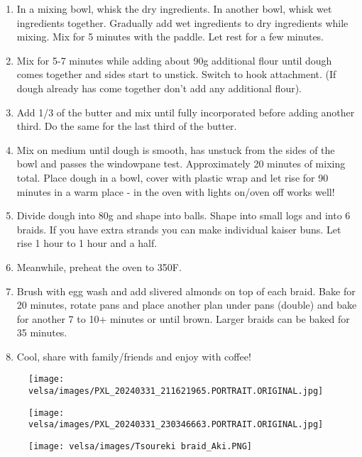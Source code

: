 \begin{enumerate}
    \item  In a mixing bowl, whisk the dry ingredients. In another bowl, whisk wet ingredients together. Gradually add wet ingredients to dry ingredients while mixing. Mix for 5 minutes with the paddle. Let rest for a few minutes.
    \item  Mix for 5-7 minutes while adding about 90g additional flour until dough comes together and sides start to unstick. Switch to hook attachment. (If dough already has come together don't add any additional flour).
    \item  Add 1/3 of the butter and mix until fully incorporated before adding another third. Do the same for the last third of the butter.
    \item  Mix on medium until dough is smooth, has unstuck from the sides of the bowl and passes the windowpane test. Approximately 20 minutes of mixing total. Place dough in a bowl, cover with plastic wrap and let rise for 90 minutes in a warm place - in the oven with lights on/oven off works well!
    \item  Divide dough into 80g and shape into balls. Shape into small logs and into 6 braids. If you have extra strands you can make individual kaiser buns. Let rise 1 hour to 1 hour and a half. 
    \item  Meanwhile, preheat the oven to 350\degree F.
    \item  Brush with egg wash and add slivered almonds on top of each braid. Bake for 20 minutes, rotate pans and place another plan under pans (double) and bake for another 7 to 10+ minutes or until brown. Larger braids can be baked for 35 minutes.
    \item  Cool, share with family/friends and enjoy with coffee!
\end{enumerate}

\begin{figure}
  \texttt{[image: velsa/images/PXL\_20240331\_211621965.PORTRAIT.ORIGINAL.jpg]}
\end{figure}
\begin{figure}
  \texttt{[image: velsa/images/PXL\_20240331\_230346663.PORTRAIT.ORIGINAL.jpg]}
\end{figure}
\begin{figure}
  \texttt{[image: velsa/images/Tsoureki braid\_Aki.PNG]}
\end{figure}
